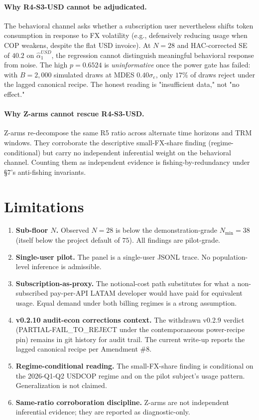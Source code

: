 \documentclass[11pt,letterpaper]{article}
\begin{document}
\paragraph{Why R4-S3-USD cannot be adjudicated.}
The behavioral channel asks whether a subscription user nevertheless
shifts token consumption in response to FX volatility (e.g.,
defensively reducing usage when COP weakens, despite the flat USD
invoice). At \(N=28\) and HAC-corrected SE of \(40.2\) on
\(\hat\alpha_1^{USD}\), the regression cannot distinguish meaningful
behavioral response from noise. The high \(p = 0.6524\) is
\emph{uninformative} once the power gate has failed: with \(B=2{,}000\)
simulated draws at MDES \(0.40 \sigma_e\), only \(17\%\) of draws
reject under the lagged canonical recipe. The honest reading is
"insufficient data," not "no effect."

\paragraph{Why Z-arms cannot rescue R4-S3-USD.}
Z-arms re-decompose the same R5 ratio across alternate time horizons
and TRM windows. They corroborate the descriptive small-FX-share
finding (regime-conditional) but carry no independent inferential
weight on the behavioral channel. Counting them as independent
evidence is fishing-by-redundancy under \S 7's anti-fishing
invariants.

\section{Limitations}
\label{sec:limits}

\begin{enumerate}[leftmargin=*,nosep]
\item \textbf{Sub-floor \(N\).} Observed \(N = 28\) is below the
  demonstration-grade \(N_{\min} = 38\) (itself below the project
  default of \(75\)). All findings are pilot-grade.
\item \textbf{Single-user pilot.} The panel is a single-user JSONL
  trace. No population-level inference is admissible.
\item \textbf{Subscription-as-proxy.} The notional-cost path
  substitutes for what a non-subscribed pay-per-API LATAM developer
  would have paid for equivalent usage. Equal demand under both
  billing regimes is a strong assumption.
\item \textbf{v0.2.10 audit-econ corrections context.} The withdrawn
  v0.2.9 verdict (PARTIAL-FAIL\_TO\_REJECT under the contemporaneous
  power-recipe pin) remains in git history for audit trail. The
  current write-up reports the lagged canonical recipe per
  Amendment \#8.
\item \textbf{Regime-conditional reading.} The small-FX-share
  finding is conditional on the 2026-Q1-Q2 USDCOP regime and on the
  pilot subject's usage pattern. Generalization is not claimed.
\item \textbf{Same-ratio corroboration discipline.} Z-arms are not
  independent inferential evidence; they are reported as
  diagnostic-only.
\end{enumerate}
\end{document}
